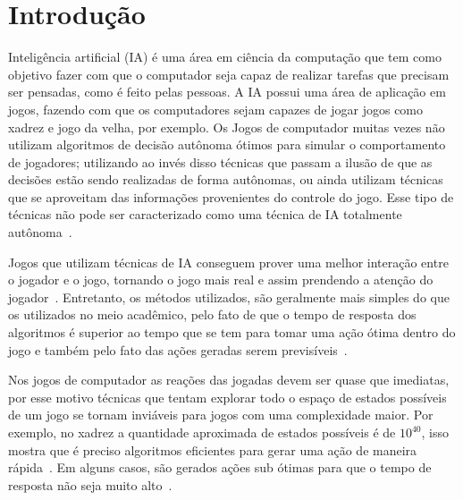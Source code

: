 \chapter{\label{chap:intro}Introdução}

Inteligência artificial (IA) é uma área em ciência da computação que tem como objetivo fazer com que o computador seja capaz de realizar tarefas que precisam ser pensadas, como é feito pelas pessoas. A IA possui uma área de aplicação em jogos, fazendo com que os computadores sejam capazes de jogar jogos como xadrez e jogo da velha, por exemplo. 
Os Jogos de computador muitas vezes não utilizam algoritmos de decisão autônoma ótimos para simular o comportamento de jogadores; utilizando ao invés disso técnicas que passam a ilusão de que as decisões estão sendo realizadas de forma autônomas, ou ainda utilizam técnicas que se aproveitam das informações provenientes do controle do jogo. Esse tipo de técnicas não pode ser caracterizado como uma técnica de IA totalmente autônoma~\cite{millington2009artificial}.

Jogos que utilizam técnicas de IA conseguem prover uma melhor interação entre o jogador e o jogo, tornando o jogo mais real e assim prendendo a atenção do jogador~\cite{millington2009artificial}.
Entretanto, os métodos utilizados, são geralmente mais simples do que os utilizados no meio acadêmico, pelo fato de que o tempo de resposta dos algoritmos é superior ao tempo que se tem para tomar uma ação ótima dentro do jogo e também pelo fato das ações geradas serem previsíveis~\cite{intelligence2003modern}.

Nos jogos de computador as reações das jogadas devem ser quase que imediatas, por esse motivo técnicas que tentam explorar todo o espaço de estados possíveis de um jogo se tornam inviáveis para jogos com uma complexidade maior.
Por exemplo, no xadrez a quantidade aproximada de estados possíveis é de $10^{40}$, isso mostra que é preciso algoritmos eficientes para gerar uma ação de maneira rápida~\cite{millington2009artificial}. 
Em alguns casos, são gerados ações sub ótimas para que o tempo de resposta não seja muito alto~\cite{intelligence2003modern}. 

